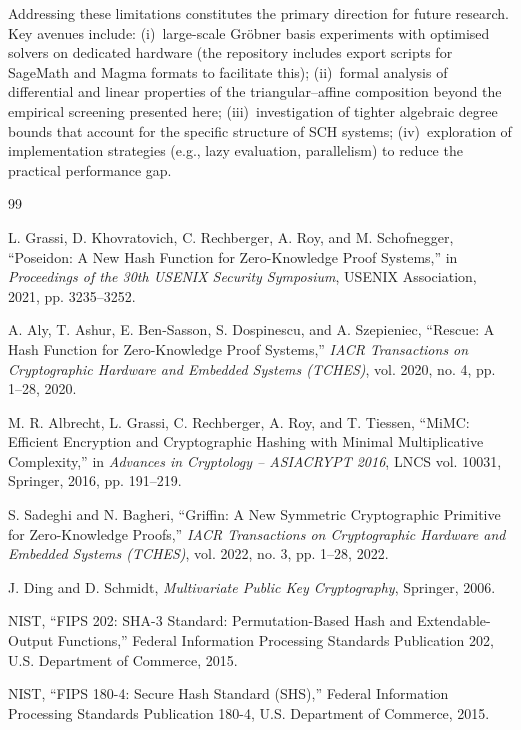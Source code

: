 ﻿\documentclass[english]{aucmcs}
\begin{document}
Addressing these limitations constitutes the primary direction for future
research. Key avenues include: (i)~large-scale Gr\"obner basis experiments
with optimised solvers on dedicated hardware (the repository includes
export scripts for SageMath and Magma formats to facilitate this);
(ii)~formal analysis of
differential and linear properties of the triangular--affine composition
beyond the empirical screening presented here;
(iii)~investigation of tighter algebraic degree bounds that account for the
specific structure of SCH systems; (iv)~exploration of implementation
strategies (e.g., lazy evaluation, parallelism) to reduce the practical
performance gap.







\begin{thebibliography}{99}

L. Grassi, D. Khovratovich, C. Rechberger, A. Roy, and M. Schofnegger,
``Poseidon: A New Hash Function for Zero-Knowledge Proof Systems,''
in \emph{Proceedings of the 30th USENIX Security Symposium},
USENIX Association, 2021, pp. 3235--3252.

A. Aly, T. Ashur, E. Ben-Sasson, S. Dospinescu, and A. Szepieniec,
``Rescue: A Hash Function for Zero-Knowledge Proof Systems,''
\emph{IACR Transactions on Cryptographic Hardware and Embedded Systems (TCHES)},
vol. 2020, no. 4, pp. 1--28, 2020.

M. R. Albrecht, L. Grassi, C. Rechberger, A. Roy, and T. Tiessen,
``MiMC: Efficient Encryption and Cryptographic Hashing with Minimal
Multiplicative Complexity,''
in \emph{Advances in Cryptology -- ASIACRYPT 2016},
LNCS vol. 10031, Springer, 2016, pp. 191--219.

S. Sadeghi and N. Bagheri,
``Griffin: A New Symmetric Cryptographic Primitive for Zero-Knowledge Proofs,''
\emph{IACR Transactions on Cryptographic Hardware and Embedded Systems (TCHES)},
vol. 2022, no. 3, pp. 1--28, 2022.

J. Ding and D. Schmidt,
\emph{Multivariate Public Key Cryptography},
Springer, 2006.

NIST,
``FIPS 202: SHA-3 Standard: Permutation-Based Hash and Extendable-Output Functions,''
Federal Information Processing Standards Publication 202,
U.S. Department of Commerce, 2015.

NIST,
``FIPS 180-4: Secure Hash Standard (SHS),''
Federal Information Processing Standards Publication 180-4,
U.S. Department of Commerce, 2015.


\end{thebibliography}
\end{document}
